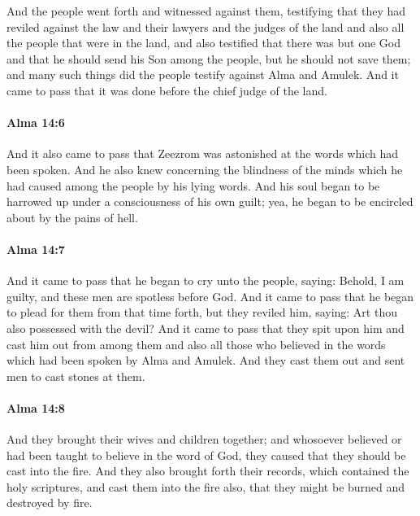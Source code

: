			And the people went forth and witnessed against them,
			testifying that they had reviled against the law
			and their lawyers and the judges of the land
			and also all the people that were in the land,
			and also testified that there was but one God
			and that he should send his Son among the people,
			but he should not save them;
			and many such things did the people testify against Alma and Amulek.
			And it came to pass that it was done before the chief judge of the land.

		\paragraph{Alma 14:6} %
			\label{ALMA-14-6}

			And it also came to pass that
			Zeezrom was astonished at the words which had been spoken.
			And he also knew concerning the blindness of the minds
			which he had caused among the people by his lying words.
			And his soul began to be harrowed up under a consciousness of his own guilt;
			yea, he began to be encircled about by the pains of hell.

		\paragraph{Alma 14:7} %
			\label{ALMA-14-7}

			And it came to pass that he began to cry unto the people, saying:
			Behold, I am guilty, and these men are spotless before God.
			And it came to pass that he began to plead for them from that time forth,
			but they reviled him, saying:
			Art thou also possessed with the devil?
			And it came to pass that they spit upon him
			and cast him out from among them
			and also all those who believed in the words
			which had been spoken by Alma and Amulek.
			And they cast them out and sent men to cast stones at them.

		\paragraph{Alma 14:8} %
			\label{ALMA-14-8}

			And they brought their wives and children together;
			and whosoever believed or had been taught to believe in the word of God,
			they caused that they should be cast into the fire.
			And they also brought forth their records,
			which contained the holy scriptures, and cast them into the fire also,
			that they might be burned and destroyed by fire.

